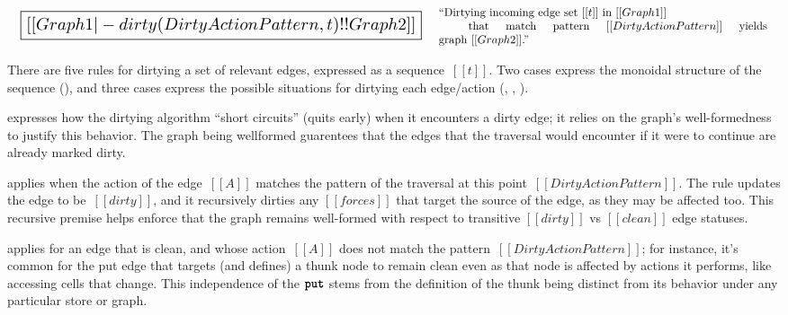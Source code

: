 \documentclass[11pt]{article}
\renewcommand{\ottkw}[1]{\textbf{\texttt{#1}}}
\begin{document}
\[
\begin{array}{lc}
  {\scalebox{1.5}{
  \boxed{[[Graph1 |- dirty ( DirtyActionPattern , t ) !! Graph2]]}}}
&
\begin{array}{p{4in}}
  ``Dirtying incoming edge set~$[[t]]$ in $[[Graph1]]$\\
  \hspace{4mm}~that match pattern~$[[DirtyActionPattern]]$ yields graph~$[[Graph2]]$.''
\end{array}
\end{array}
\]

\begin{mathpar}
\end{mathpar}

There are five rules for dirtying a set of relevant edges, expressed as a sequence~$[[t]]$.
%
Two cases express the monoidal structure of the
sequence (), and
three cases express the possible situations for dirtying each edge/action
(, ,
).

 expresses how the dirtying algorithm ``short
circuits'' (quits early) when it encounters a dirty edge; it relies on
the graph's well-formedness to justify this behavior.
%
The graph being wellformed guarentees that the edges that the traversal
would encounter if it were to continue are already marked dirty.

 applies when the action of the edge~$[[A]]$
matches the pattern of the traversal at this
point~$[[DirtyActionPattern]]$.
%
The rule updates the edge to be~$[[dirty]]$, and it recursively
dirties any $[[forces]]$ that target the source of the edge, as they
may be affected too.
%
This recursive premise helps enforce that the graph remains
well-formed with respect to transitive $[[dirty]]$ vs $[[clean]]$ edge statuses.

 applies for an edge that is clean, and whose
action~$[[A]]$ does not match the pattern~$[[DirtyActionPattern]]$;
for instance, it's common for the put edge that targets (and defines)
a thunk node to remain clean even as that node is affected by actions
it performs, like accessing cells that change.
%
This independence of the $\ottkw{put}$ stems from the definition of the
thunk being distinct from its behavior under any particular store or
graph.
\end{document}
